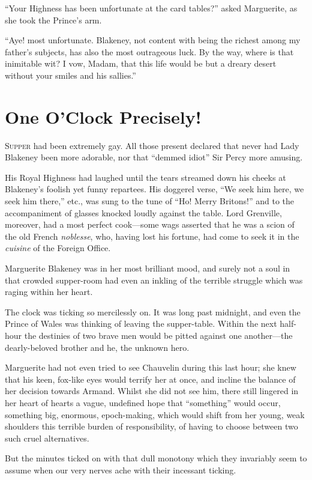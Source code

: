 \documentclass[paper=5.5in:8.5in,BCOR=7mm,twoside,DIV=calc,12pt,usegeometry,chapterprefix,endperiod,headings=big]{scrbook}
\begin{document}
\enquote{Your Highness has been unfortunate at the card tables?} asked Marguerite, as she took the Prince's arm.

\enquote{Aye! most unfortunate. Blakeney, not content with being the richest among my father's subjects, has also the most outrageous luck. By the way, where is that inimitable wit? I vow, Madam, that this life would be but a dreary desert without your smiles and his sallies.}

\chapter{One O'Clock Precisely!}
\lettrine[lines=4]{S}{upper} had been extremely gay. All those present declared that never had Lady Blakeney been more adorable, nor that \enquote{demmed idiot} Sir Percy more amusing.

His Royal Highness had laughed until the tears streamed down his cheeks at Blakeney's foolish yet funny repartees. His doggerel verse, \enquote{We seek him here, we seek him there,} etc., was sung to the tune of \enquote{Ho! Merry Britons!} and to the accompaniment of glasses knocked loudly against the table. Lord Grenville, moreover, had a most perfect cook---some wags asserted that he was a scion of the old French \textit{noblesse}, who, having lost his fortune, had come to seek it in the \textit{cuisine} of the Foreign Office.

Marguerite Blakeney was in her most brilliant mood, and surely not a soul in that crowded supper-room had even an inkling of the terrible struggle which was raging within her heart.

The clock was ticking so mercilessly on. It was long past midnight, and even the Prince of Wales was thinking of leaving the supper-table. Within the next half-hour the destinies of two brave men would be pitted against one another---the dearly-beloved brother and he, the unknown hero.

Marguerite had not even tried to see Chauvelin during this last hour; she knew that his keen, fox-like eyes would terrify her at once, and incline the balance of her decision towards Armand. Whilst she did not see him, there still lingered in her heart of hearts a vague, undefined hope that \enquote{something} would occur, something big, enormous, epoch-making, which would shift from her young, weak shoulders this terrible burden of responsibility, of having to choose between two such cruel alternatives.

But the minutes ticked on with that dull monotony which they invariably seem to assume when our very nerves ache with their incessant ticking.
\end{document}
